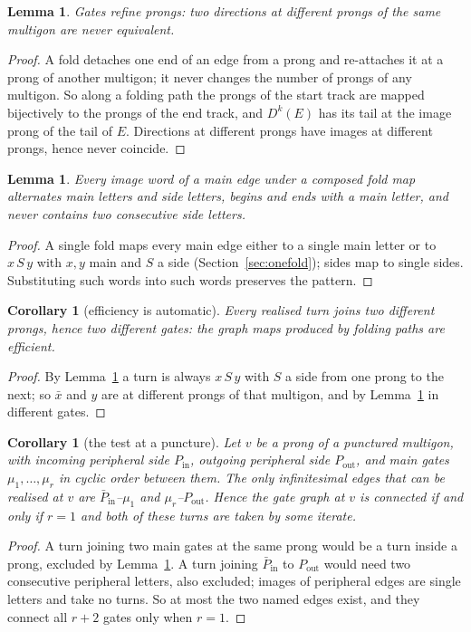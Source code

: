 \documentclass[12pt]{amsart}
\newcommand{\anti}[1]{\bar{#1}}          %
\newcommand{\Dg}{D}                       %
\newcommand{\per}{P}                      %
\theoremstyle{plain}
\newtheorem{Lemma}[Theorem]{Lemma}
\newtheorem{Corollary}[Theorem]{Corollary}
\theoremstyle{definition}
\begin{document}
\begin{Lemma}
  \label{lem:refine}
  Gates refine prongs: two directions at different prongs of the same
  multigon are never equivalent.
\end{Lemma}
\begin{proof}
  A fold detaches one end of an edge from a prong and re-attaches it at
  a prong of another multigon; it never changes the number of prongs of
  any multigon.  So along a folding path the prongs of the start track
  are mapped bijectively to the prongs of the end track, and
  $\Dg^k(E)$ has its tail at the image prong
  of the tail of $E$.  Directions at different prongs have images at
  different prongs, hence never coincide.
\end{proof}

\begin{Lemma}
  \label{lem:alternate}
  Every image word of a main edge under a composed fold map alternates
  main letters and side letters, begins and ends with a main letter, and
  never contains two consecutive side letters.
\end{Lemma}
\begin{proof}
  A single fold maps every main edge either to a single main letter or to
  $x\,S\,y$ with $x,y$ main and $S$ a side (Section~\ref{sec:onefold});
  sides map to single sides.  Substituting such words into such words
  preserves the pattern.
\end{proof}

\begin{Corollary}[efficiency is automatic]
  \label{cor:efficient}
  Every realised turn joins two different prongs, hence two different
  gates: the graph maps produced by folding paths are efficient.
\end{Corollary}
\begin{proof}
  By Lemma~\ref{lem:alternate} a turn is always $x\,S\,y$ with $S$ a
  side from one prong to the next; so $\anti x$ and $y$ are at different
  prongs of that multigon, and by Lemma~\ref{lem:refine} in different
  gates.
\end{proof}

\begin{Corollary}[the test at a puncture]
  \label{cor:puncture}
  Let $v$ be a prong of a punctured multigon, with incoming peripheral
  side $\per_{\mathrm{in}}$, outgoing peripheral side
  $\per_{\mathrm{out}}$, and main gates $\mu_1,\dots,\mu_r$ in cyclic
  order between them.  The only infinitesimal edges that can be realised
  at $v$ are $\anti\per_{\mathrm{in}}$--$\mu_1$ and
  $\mu_r$--$\per_{\mathrm{out}}$.  Hence the gate graph at $v$ is
  connected if and only if $r=1$ and both of these turns are taken by
  some iterate.
\end{Corollary}
\begin{proof}
  A turn joining two main gates at the same prong would be a turn inside
  a prong, excluded by Lemma~\ref{lem:alternate}.  A turn joining
  $\anti\per_{\mathrm{in}}$ to $\per_{\mathrm{out}}$ would need two
  consecutive peripheral letters, also excluded; images of peripheral
  edges are single letters and take no turns.  So at most the two named
  edges exist, and they connect all $r+2$ gates only when $r=1$.
\end{proof}
\end{document}
